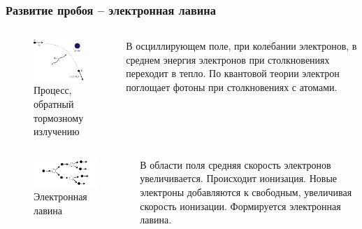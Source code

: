 \documentclass{beamer}
\begin{document}
	\begin{frame}
		\frametitle{Развитие пробоя -- электронная лавина}
		
		\begin{columns}
			\begin{figure}
				\centering
				\includegraphics[width=0.7\linewidth]{res/inverse_bremsstrahlung.png}
				\caption*{Процесс, обратный тормозному излучению}
			\end{figure}
			В осциллирующем поле, при колебании электронов, в среднем энергия электронов при столкновениях переходит в тепло.
			По квантовой теории электрон поглощает фотоны при столкновениях с атомами.
		\end{columns}
		\begin{columns}
			\column{0.5\linewidth}
			\begin{figure}
				\centering
				\includegraphics[width=0.8\linewidth]{res/electron_avalanche.png}
				\caption*{Электронная лавина}
			\end{figure}
		
			\column{0.5\linewidth}
			В области поля средняя скорость электронов увеличивается. Происходит ионизация. Новые электроны добавляются к свободным, увеличивая скорость ионизации. Формируется электронная лавина.
			

\end{columns}
\end{frame}
\end{document}
